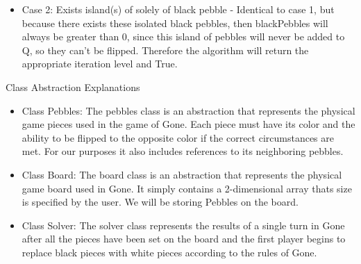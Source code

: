 \documentclass{article}
\begin{document}
\begin{itemize}
\begin{itemize}
\begin{itemize}
			\item {Case 2: Exists island(s) of solely of black pebble - Identical to case 1, but because there exists these isolated black pebbles, then blackPebbles will always be greater than 0, since this island of pebbles will never be added to Q, so they can't be flipped. Therefore the algorithm will return the appropriate iteration level and True.}

		\end{itemize}
	\end{itemize}
\end{itemize}
Class Abstraction Explanations
\begin{itemize}
\item {Class Pebbles: The pebbles class is an abstraction that represents the physical game pieces used in the game of Gone. Each piece must have its color and the ability to be flipped to the opposite color if the correct circumstances are met. For our purposes it also includes references to its neighboring pebbles.}
\item {Class Board: The board class is an abstraction that represents the physical game board used in Gone. It simply contains a 2-dimensional array thats size is specified by the user. We will be storing Pebbles on the board.}
\item {Class Solver: The solver class represents the results of a single turn in Gone after all the pieces have been set on the board and the first player begins to replace black pieces with white pieces according to the rules of Gone.}
\end{itemize}
\end{document}

